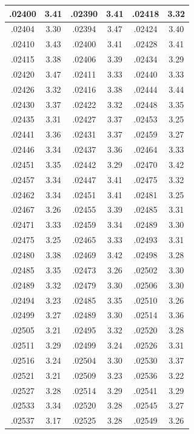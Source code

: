\documentclass[10pt,twoside]{report}
\begin{document}
\begin{appendices}
\begin{longtable}{|c|c||c|c||c|c|}
.02400 & 3.41 & .02390 & 3.41 & .02418 & 3.32\\\hline
.02404 & 3.30 & .02394 & 3.47 & .02424 & 3.40\\\hline
.02410 & 3.43 & .02400 & 3.41 & .02428 & 3.41\\\hline
.02415 & 3.38 & .02406 & 3.39 & .02434 & 3.29\\\hline
.02420 & 3.47 & .02411 & 3.33 & .02440 & 3.33\\\hline
.02426 & 3.32 & .02416 & 3.38 & .02444 & 3.44\\\hline
.02430 & 3.37 & .02422 & 3.32 & .02448 & 3.35\\\hline
.02435 & 3.31 & .02427 & 3.37 & .02453 & 3.25\\\hline
.02441 & 3.36 & .02431 & 3.37 & .02459 & 3.27\\\hline
.02446 & 3.34 & .02437 & 3.36 & .02464 & 3.33\\\hline
.02451 & 3.35 & .02442 & 3.29 & .02470 & 3.42\\\hline
.02457 & 3.34 & .02447 & 3.41 & .02475 & 3.32\\\hline
.02462 & 3.34 & .02451 & 3.41 & .02481 & 3.25\\\hline
.02467 & 3.26 & .02455 & 3.39 & .02485 & 3.31\\\hline
.02471 & 3.33 & .02459 & 3.34 & .02489 & 3.30\\\hline
.02475 & 3.25 & .02465 & 3.33 & .02493 & 3.31\\\hline
.02480 & 3.38 & .02469 & 3.42 & .02498 & 3.28\\\hline
.02485 & 3.35 & .02473 & 3.26 & .02502 & 3.30\\\hline
.02489 & 3.32 & .02479 & 3.30 & .02506 & 3.30\\\hline
.02494 & 3.23 & .02485 & 3.35 & .02510 & 3.26\\\hline
.02499 & 3.27 & .02489 & 3.30 & .02514 & 3.36\\\hline
.02505 & 3.21 & .02495 & 3.32 & .02520 & 3.28\\\hline
.02511 & 3.29 & .02499 & 3.24 & .02526 & 3.31\\\hline
.02516 & 3.24 & .02504 & 3.30 & .02530 & 3.37\\\hline
.02521 & 3.21 & .02509 & 3.23 & .02536 & 3.22\\\hline
.02527 & 3.28 & .02514 & 3.29 & .02541 & 3.29\\\hline
.02533 & 3.34 & .02520 & 3.28 & .02545 & 3.27\\\hline
.02537 & 3.17 & .02525 & 3.28 & .02549 & 3.26\\\hline

\end{longtable}
\end{appendices}
\end{document}
